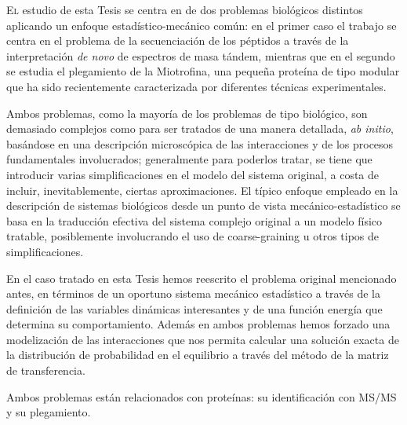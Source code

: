 \nopagebreak




\lettrine{E}{l} estudio de esta Tesis se centra en de dos problemas
biológicos distintos aplicando un enfoque estadístico-mecánico común:
en el primer caso el trabajo se centra en el problema de la secuenciación de los
péptidos a través de la interpretación \emph{de novo} de espectros de masa
tándem, mientras que en el segundo se estudia el plegamiento de la Miotrofina,
una pequeña proteína de tipo modular que ha sido recientemente caracterizada por
diferentes técnicas experimentales.
 
Ambos problemas, como la mayoría de los problemas de tipo biológico, son
demasiado complejos como para ser tratados de una manera detallada, \emph{ab
initio}, basándose en una descripción microscópica de las interacciones y de
los procesos fundamentales involucrados; generalmente para poderlos tratar, se tiene que introducir
varias simplificaciones en el modelo del sistema original, a costa de
incluir, inevitablemente, ciertas aproximaciones.
El típico enfoque empleado en la descripción de sistemas biológicos desde un
punto de vista mecánico-estadístico se basa en la traducción efectiva del
sistema complejo original a un modelo físico tratable, posiblemente involucrando
el uso de coarse-graining u otros tipos de simplificaciones.

En el caso tratado en esta Tesis hemos reescrito el problema original mencionado antes, en
términos de un oportuno sistema mecánico estadístico a través de la definición
de las variables dinámicas interesantes y de una función energía que determina
su comportamiento.
Además en ambos problemas hemos forzado una modelización de las interacciones que
nos permita calcular una solución exacta de la distribución de probabilidad en el
equilibrio a través del método de la matriz de transferencia.

Ambos problemas están relacionados con proteínas: su identificación con MS/MS y su
plegamiento. 


